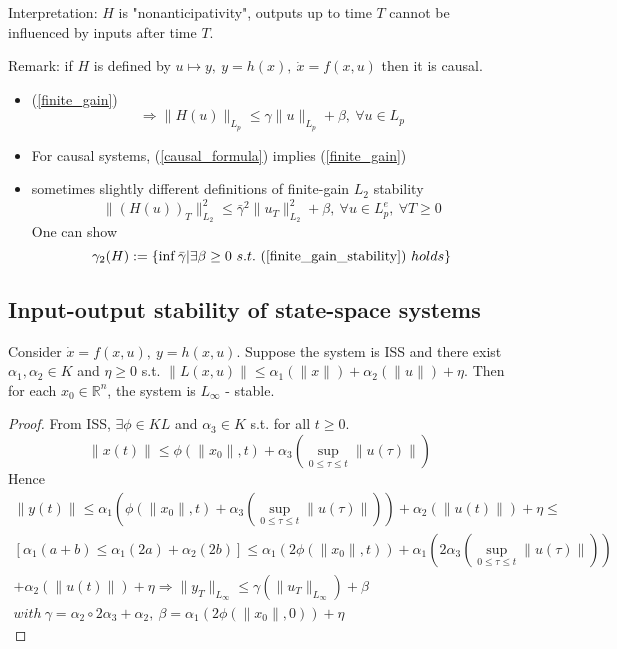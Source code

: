 Interpretation: $H$ is "nonanticipativity", outputs up to time $T$ cannot be influenced by inputs after time $T$.

Remark: if $H$ is defined by $u \mapsto y, \ y = h(x), \ \dot{x} = f(x,u)$ then it is causal.
\begin{itemize}
\item (\ref{finite_gain})
\begin{equation}\label{causal_formula}
\Rightarrow \|H(u)\|_{L_p} \leq \gamma \|u\|_{L_p} + \beta, \ \forall u \in L_p
\end{equation}
\item For causal systems, (\ref{causal_formula}) implies (\ref{finite_gain})
\item sometimes slightly different definitions of finite-gain $L_2$ stability
\begin{equation}\label{finite_gain_stability}
\|(H(u))_T\|^2_{L_2} \leq \bar{\gamma}^2 \|u_T\|^2_{L_2} + \beta, \ \forall u \in L_p^e, \ \forall T \geq 0
\end{equation}
One can show 
\begin{equation*}
\gamma_2(H) := \{ \inf \bar{\gamma} | \exists \beta \geq 0 \ s.t. \ (\ref{finite_gain_stability})\ holds \}
\end{equation*}
\end{itemize}

\subsection{Input-output stability of state-space systems}

\begin{Theorem}
Consider $\dot{x} = f(x,u), \ y = h(x,u)$. Suppose the system is ISS and there exist $\alpha_1, \alpha_2 \in K$ and $\eta \geq 0$ s.t. $\|L(x,u)\| \leq \alpha_1(\|x\|) + \alpha_2(\|u\|) + \eta$. Then for each $x_0 \in \mathbb{R}^n$, the system is $L_{\infty}$ - stable.
\begin{proof}
From ISS, $\exists \phi \in KL$ and $\alpha_3 \in K$ s.t. for all $t \geq 0$.
\begin{equation*}
\|x(t)\| \leq \phi(\|x_0\|, t) + \alpha_3(\sup_{0\leq \tau \leq t}\|u(\tau)\|)
\end{equation*}
Hence 
\begin{equation*}
\begin{split}
\|y(t)\| \leq \alpha_1(\phi (\|x_0\|, t) + \alpha_3(\sup_{ 0 \leq \tau 
\leq t}\|u(\tau)\|)) + \alpha_2(\|u(t)\|) + \eta \leq \\ 
[\alpha_1(a+b) \leq \alpha_1(2a)+\alpha_2(2b)] \leq \alpha_1(2\phi(\|x_0\|,t)) + \alpha_1(2 \alpha_3(\sup_{0 \leq \tau \leq t}\|u(\tau)\|))\\
+ \alpha_2(\|u(t)\|)+\eta \Rightarrow \|y_T\|_{L_{\infty}} \leq \gamma(\|u_T\|_{L_{\infty}}) + \beta \\
with\ \gamma = \alpha_2 \circ 2\alpha_3 + \alpha_2, \ \beta = \alpha_1(2\phi(\|x_0\|,0)) + \eta
\end{split}
\end{equation*}
\end{proof}
\end{Theorem}


